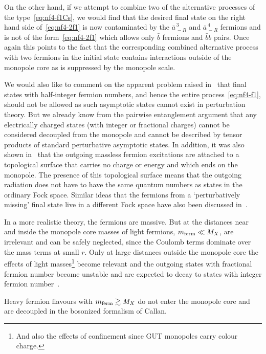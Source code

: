 \documentclass[a4paper,11pt]{article}
\begin{document}
On the other hand, if we attempt to combine two of the alternative processes of the type~\eqref{eq:nf4-f1Cs},
we would find that the desired final state on the right hand side of~\eqref{eq:nf4-2f1} is now contaminated 
by the $\bar{a}_{\,-R}^{\,3} $ and $\bar{a}_{\,-R}^{\,4} $ fermions and is not of the form~\eqref{eq:nf4-2f1} which allows only $\bar{b}$ fermions and $\bar{b}b$ pairs.
Once again this points to the fact that the corresponding combined alternative process with two fermions in the initial state contains interactions outside of the monopole core as is suppressed  by the monopole scale.

We would also like to comment on the apparent problem raised in~\cite{Csaki:2022qtz} that final states with half-integer fermion numbers, and hence the entire process~\eqref{eq:nf4-f1},
should not be allowed as such asymptotic states cannot exist in perturbation theory.
But we already know from the pairwise entanglement argument that any electrically charged states (with integer or fractional charges) cannot be considered decoupled from the monopole and cannot be described by tensor products of standard perturbative asymptotic states. 
In addition, it was also shown in~\cite{vanBeest:2023dbu} 
that the outgoing massless fermion excitations are attached to a topological surface that carries no charge or energy and which ends on the monopole. The presence of this topological surface means that the outgoing radiation does not have to have the same quantum numbers as states in the ordinary Fock space.
Similar ideas that the fermions from a `perturbatively missing' final state live in a different Fock space have also been discussed in~\cite{Kitano:2021pwt,Hamada:2022eiv}. 

In a more realistic theory, the fermions are massive. But at the distances near and inside the monopole core masses of light fermions, $m_{\rm ferm} \ll M_X$, are irrelevant and can be safely neglected, since the Coulomb terms dominate over the mass terms at small $r$. 
Only at large distances outside the monopole core the effects of light masses\footnote{And also the effects of confinement since GUT monopoles carry colour charge.}
 become relevant and 
the outgoing states with fractional fermion number become unstable and are expected to decay to states with integer fermion number~\cite{Callan:1982au,Callan:1983tm,Sen:1984qe,Preskill:1984gd,Rubakov:1988aq}.

Heavy fermion flavours with $m_{\rm ferm} \gtrsim M_X$ do not enter the monopole core and are decoupled in the bosonized formalism of Callan. 
\end{document}
